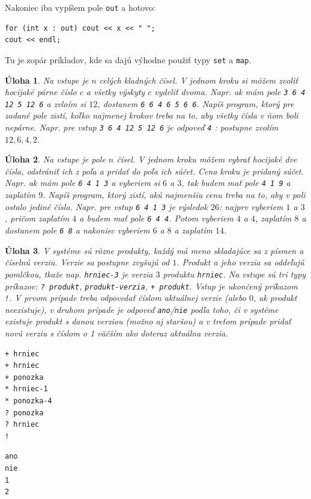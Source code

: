 \documentclass[10pt]{article}
\def\prg{\lstinline}
\def\ods{\vspace*{10pt}}
\newtheorem{uloha}{Úloha}
\def\bp{\begin{minipage}[t]{0.45\textwidth}\vspace{0pt}}
\def\ep{\end{minipage}}
\begin{document}
{\ods
Nakoniec iba vypíšem pole \prg!out! a hotovo:
\begin{lstlisting}
for (int x : out) cout << x << " ";
cout << endl;
\end{lstlisting}

Tu je zopár príkladov, kde sa dajú výhodne použiť typy \prg!set! a \prg!map!.

\begin{uloha}
  Na vstupe je $n$ celých kladných čísel. V jednom kroku si môžem zvoliť hocijaké
  párne číslo $c$ a všetky výskyty $c$ vydeliť dvoma. Napr. ak mám pole
  {\tt 3 6 4 12 5 12 6} a zvloím si $12$, dostanem {\tt 6 6 4 6 5 6 6}.
  Napíš program, ktorý pre zadané pole zistí, koľko najmenej krokov treba 
  na to, aby všetky čísla v ňom boli nepárne. Napr. pre vstup 
  {\tt 3 6 4 12 5 12 6} je odpoveď {\tt 4} : postupne zvolím $12, 6, 4, 2$.
\end{uloha}

\begin{uloha}
  Na vstupe je pole $n$ čísel. V jednom kroku môžem vybrať hocijaké dve čísla, odstrániť
  ich z poľa a pridať do poľa ich súčet. Cena kroku je pridaný súčet. Napr. ak mám
  pole {\tt 6 4 1 3} a vyberiem si $6$ a $3$, tak budem mať pole {\tt 4 1 9} a 
  zaplatím $9$. Napíš program, ktorý zistí, akú najmenšiu cenu treba na to, aby
  v poli ostalo jediné číslo. Napr. pre vstup  {\tt 6 4 1 3} je výsledok $26$:
  najprv vyberiem $1$ a $3$, pričom zaplatím $4$ a budem mať pole {\tt 6 4 4}.
  Potom vyberiem $4$ a $4$, zaplatím $8$ a dostanem pole {\tt 6 8} a nakoniec
  vyberiem $6$ a $8$ a zaplatím $14$.
\end{uloha}

\begin{uloha}
  V systéme sú rôzne produkty, každý má meno skladajúce sa z písmen a číselnú
  verziu. Verzie sa postupne zvyšujú od $1$. Produkt a jeho verzia sa oddeľujú
  pomlčkou, tkaže nap. {\tt hrniec-3} je verzia $3$ produktu {\tt hrniec}.
  Na vstupe sú tri typy príkazov: {\tt ? produkt}, {\tt * produkt-verzia}, 
  \hbox{\tt + produkt}. Vstup je ukončený príkazom {\tt !}.
  V prvom prípade treba odpovedať číslom aktuálnej verzie (alebo $0$,
  ak produkt neexistuje), v druhom prípade je odpoveď {\tt ano}/{\tt nie} podľa toho,
  či v systéme existuje produkt s danou verziou (možno aj staršou) a v treťom prípade 
  pridať novú verziu s číslom o 1 väčším ako doteraz aktuálna verzia.

  \ods
\bp
\begin{verbatim}
+ hrniec
+ hrniec
+ ponozka
* hrniec-1
* ponozka-4
? ponozka
? hrniec
!
\end{verbatim}
\ep
\bp
\begin{verbatim}
ano
nie
1
2
\end{verbatim}
\ep
\end{uloha}

}
\end{document}
